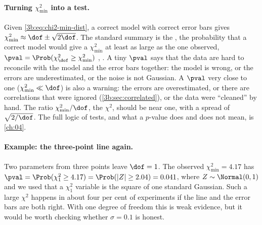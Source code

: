 \paragraph{Turning $\chi^2_{\min}$ into a test.}
Given \eqref{3b:eq:chi2-min-dist}, a correct model with correct error bars
gives $\chi^2_{\min}\approx\dof\pm\sqrt{2\dof}$. The standard summary is
the , the probability that a correct
model would give a $\chi^2_{\min}$ at least as large as the one observed,
$\pval=\Prob(\chi^2_\dof\ge\chi^2_{\min})$ ,
. A tiny $\pval$ says that the data are hard to
reconcile with the model and the error bars together: the model is wrong,
or the errors are underestimated, or the noise is not Gaussian. A
$\pval$ very close to one ($\chi^2_{\min}\ll\dof$) is also a warning: the
errors are overestimated, or there are correlations that were ignored
(\cref{3b:sec:correlated}), or the data were ``cleaned'' by hand. The
ratio $\chi^2_{\min}/\dof$, the  $\chi^2$, should be near
one, with a spread of $\sqrt{2/\dof}$. The full logic of tests, and what a
$p$-value does and does not mean, is \cref{ch:04}.

\paragraph{Example: the three-point line again.}
Two parameters from three points leave $\dof=1$. The observed
$\chi^2_{\min}=4.17$ has
$\pval=\Prob(\chi^2_1\ge4.17)=\Prob(|Z|\ge2.04)=0.041$, where
$Z\sim\Normal(0,1)$ and we used that a $\chi^2_1$ variable is the square of
one standard Gaussian. Such a large $\chi^2$ happens in about four per cent
of experiments if the line and the error bars are both right. With one
degree of freedom this is weak evidence, but it would be worth checking
whether $\sigma=0.1$ is honest.

